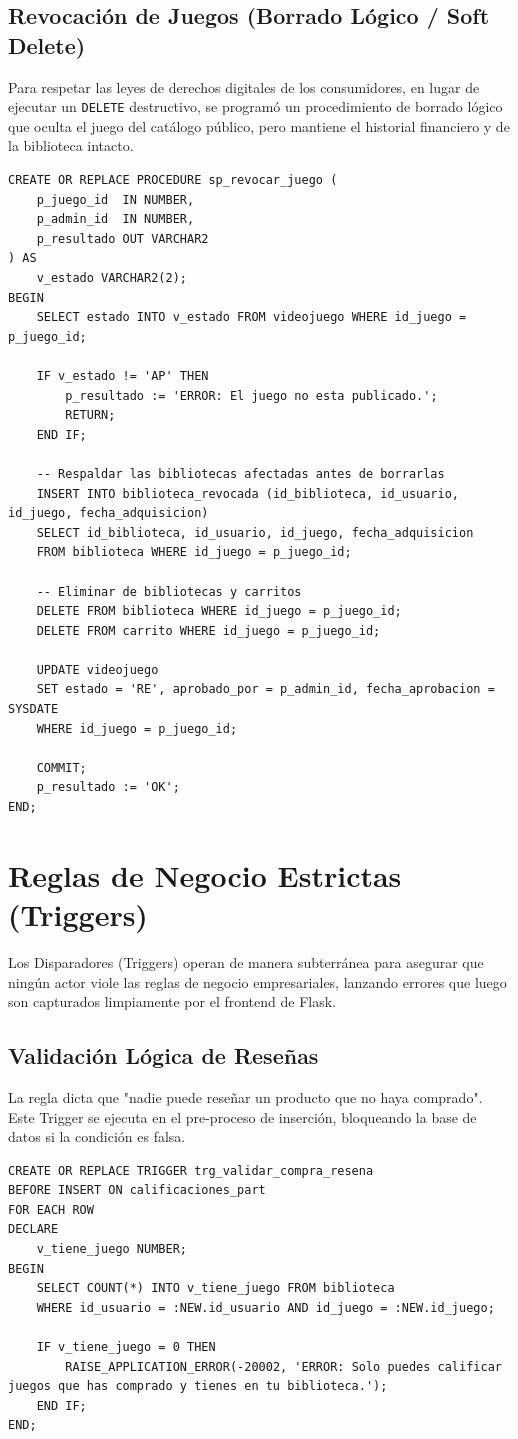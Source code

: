 \documentclass[12pt,a4paper]{article}
\begin{document}
\subsection{Revocación de Juegos (Borrado Lógico / Soft Delete)}
Para respetar las leyes de derechos digitales de los consumidores, en lugar de ejecutar un \texttt{DELETE} destructivo, se programó un procedimiento de borrado lógico que oculta el juego del catálogo público, pero mantiene el historial financiero y de la biblioteca intacto.

\begin{lstlisting}
CREATE OR REPLACE PROCEDURE sp_revocar_juego (
    p_juego_id  IN NUMBER,
    p_admin_id  IN NUMBER,
    p_resultado OUT VARCHAR2
) AS
    v_estado VARCHAR2(2);
BEGIN
    SELECT estado INTO v_estado FROM videojuego WHERE id_juego = p_juego_id;
    
    IF v_estado != 'AP' THEN
        p_resultado := 'ERROR: El juego no esta publicado.';
        RETURN;
    END IF;
    
    -- Respaldar las bibliotecas afectadas antes de borrarlas
    INSERT INTO biblioteca_revocada (id_biblioteca, id_usuario, id_juego, fecha_adquisicion)
    SELECT id_biblioteca, id_usuario, id_juego, fecha_adquisicion
    FROM biblioteca WHERE id_juego = p_juego_id;
    
    -- Eliminar de bibliotecas y carritos
    DELETE FROM biblioteca WHERE id_juego = p_juego_id;
    DELETE FROM carrito WHERE id_juego = p_juego_id;
    
    UPDATE videojuego 
    SET estado = 'RE', aprobado_por = p_admin_id, fecha_aprobacion = SYSDATE
    WHERE id_juego = p_juego_id;
    
    COMMIT;
    p_resultado := 'OK';
END;
\end{lstlisting}

\section{Reglas de Negocio Estrictas (Triggers)}
Los Disparadores (Triggers) operan de manera subterránea para asegurar que ningún actor viole las reglas de negocio empresariales, lanzando errores que luego son capturados limpiamente por el frontend de Flask.

\subsection{Validación Lógica de Reseñas}
La regla dicta que "nadie puede reseñar un producto que no haya comprado". Este Trigger se ejecuta en el pre-proceso de inserción, bloqueando la base de datos si la condición es falsa.
\begin{lstlisting}
CREATE OR REPLACE TRIGGER trg_validar_compra_resena
BEFORE INSERT ON calificaciones_part
FOR EACH ROW
DECLARE
    v_tiene_juego NUMBER;
BEGIN
    SELECT COUNT(*) INTO v_tiene_juego FROM biblioteca 
    WHERE id_usuario = :NEW.id_usuario AND id_juego = :NEW.id_juego;
    
    IF v_tiene_juego = 0 THEN
        RAISE_APPLICATION_ERROR(-20002, 'ERROR: Solo puedes calificar juegos que has comprado y tienes en tu biblioteca.');
    END IF;
END;
\end{lstlisting}
\end{document}
